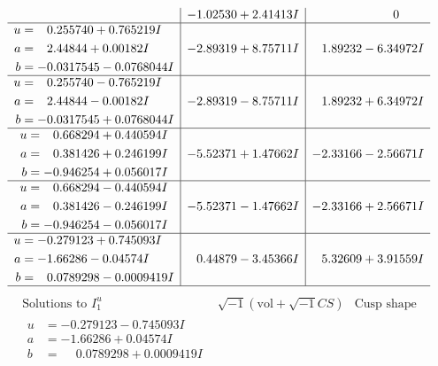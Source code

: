 \documentclass[1p]{elsarticle_modified}
\theoremstyle{definition}
\newcommand{\I}{\sqrt{-1}}
\begin{document}
$$\begin{array}{c|c|c}
 & -1.02530 + 2.41413 I & \phantom{-0.000000 } 0 \\ \hline\begin{aligned}
u &= \phantom{-}0.255740 + 0.765219 I \\
a &= \phantom{-}2.44844 + 0.00182 I \\
b &= -0.0317545 - 0.0768044 I\end{aligned}
 & -2.89319 + 8.75711 I & \phantom{-}1.89232 - 6.34972 I \\ \hline\begin{aligned}
u &= \phantom{-}0.255740 - 0.765219 I \\
a &= \phantom{-}2.44844 - 0.00182 I \\
b &= -0.0317545 + 0.0768044 I\end{aligned}
 & -2.89319 - 8.75711 I & \phantom{-}1.89232 + 6.34972 I \\ \hline\begin{aligned}
u &= \phantom{-}0.668294 + 0.440594 I \\
a &= \phantom{-}0.381426 + 0.246199 I \\
b &= -0.946254 + 0.056017 I\end{aligned}
 & -5.52371 + 1.47662 I & -2.33166 - 2.56671 I \\ \hline\begin{aligned}
u &= \phantom{-}0.668294 - 0.440594 I \\
a &= \phantom{-}0.381426 - 0.246199 I \\
b &= -0.946254 - 0.056017 I\end{aligned}
 & -5.52371 - 1.47662 I & -2.33166 + 2.56671 I \\ \hline\begin{aligned}
u &= -0.279123 + 0.745093 I \\
a &= -1.66286 - 0.04574 I \\
b &= \phantom{-}0.0789298 - 0.0009419 I\end{aligned}
 & \phantom{-}0.44879 - 3.45366 I & \phantom{-}5.32609 + 3.91559 I\\
 \hline 
 \end{array}$$\newpage$$\begin{array}{c|c|c}  
\text{Solutions to }I^u_{1}& \I (\text{vol} + \sqrt{-1}CS) & \text{Cusp shape}\\
 \hline 
\begin{aligned}
u &= -0.279123 - 0.745093 I \\
a &= -1.66286 + 0.04574 I \\
b &= \phantom{-}0.0789298 + 0.0009419 I\end{aligned}

\end{array}$$
\end{document}
